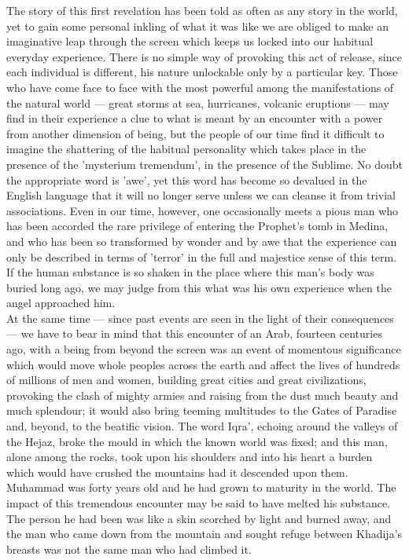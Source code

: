 \documentclass[11pt, b5paper, twoside]{book}
\begin{document}
The story of this first revelation has been told as often as any story in the world, yet to gain some 
personal inkling of what it was like we are obliged to make an imaginative leap through the screen 
which keeps us locked into our habitual everyday experience. There is no simple way of provoking this 
act of release, since each individual is different, his nature unlockable only by a particular key. 
Those who have come face to face with the most powerful among the manifestations of the natural world 
--- great storms at sea, hurricanes, volcanic eruptions --- may find in their experience a clue to what 
is meant by an encounter with a power from another dimension of being, but the people of our time 
find it difficult to imagine the shattering of the habitual personality which takes place in the 
presence of the 'mysterium tremendum', in the presence of the Sublime. No doubt the appropriate word 
is 'awe', yet this word has become so devalued in the English language that it will no longer serve 
unless we can cleanse it from trivial associations. Even in our time, however, one occasionally meets 
a pious man who has been accorded the rare privilege of entering the Prophet's tomb in Medina, and 
who has been so transformed by wonder and by awe that the experience can only be described in terms 
of 'terror' in the full and majestice sense of this term. If the human substance is so shaken in the 
place where this man's body was buried long ago, we may judge from this what was his own experience 
when the angel approached him. \\

At the same time --- since past events are seen in the light of their consequences --- we have to bear in 
mind that this encounter of an Arab, fourteen centuries ago, with a being from beyond the screen was 
an event of momentous significance which would move whole peoples across the earth and affect the 
lives of hundreds of millions of men and women, building great cities and great civilizations, 
provoking the clash of mighty armies and raising from the dust much beauty and much splendour; it 
would also bring teeming multitudes to the Gates of Paradise and, beyond, to the beatific vision. The 
word Iqra', echoing around the valleys of the Hejaz, broke the mould in which the known world was 
fixed; and this man, alone among the rocks, took upon his shoulders and into his heart a burden which 
would have crushed the mountains had it descended upon them. \\

Muhammad was forty years old and he had grown to maturity in the world. The impact of this tremendous 
encounter may be said to have melted his substance. The person he had been was like a skin scorched 
by light and burned away, and the man who came down from the mountain and sought refuge between 
Khadija's breasts was not the same man who had climbed it. \\
\end{document}
